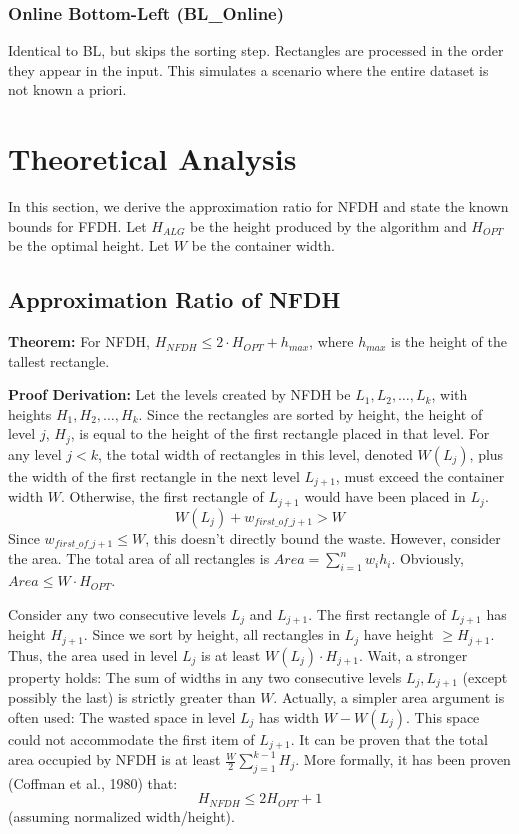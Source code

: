 \documentclass[a4paper,12pt]{article}
\begin{document}
\subsubsection{Online Bottom-Left (BL\_Online)}
Identical to BL, but skips the sorting step. Rectangles are processed in the order they appear in the input. This simulates a scenario where the entire dataset is not known a priori.

\section{Theoretical Analysis}
In this section, we derive the approximation ratio for NFDH and state the known bounds for FFDH. Let $H_{ALG}$ be the height produced by the algorithm and $H_{OPT}$ be the optimal height. Let $W$ be the container width.

\subsection{Approximation Ratio of NFDH}
\textbf{Theorem:} For NFDH, $H_{NFDH} \le 2 \cdot H_{OPT} + h_{max}$, where $h_{max}$ is the height of the tallest rectangle.

\textbf{Proof Derivation:}
Let the levels created by NFDH be $L_1, L_2, \dots, L_k$, with heights $H_1, H_2, \dots, H_k$.
Since the rectangles are sorted by height, the height of level $j$, $H_j$, is equal to the height of the first rectangle placed in that level.
For any level $j < k$, the total width of rectangles in this level, denoted $W(L_j)$, plus the width of the first rectangle in the next level $L_{j+1}$, must exceed the container width $W$. Otherwise, the first rectangle of $L_{j+1}$ would have been placed in $L_j$.
\[ W(L_j) + w_{first\_of\_j+1} > W \]
Since $w_{first\_of\_j+1} \le W$, this doesn't directly bound the waste. However, consider the area.
The total area of all rectangles is $Area = \sum_{i=1}^n w_i h_i$.
Obviously, $Area \le W \cdot H_{OPT}$.

Consider any two consecutive levels $L_j$ and $L_{j+1}$.
The first rectangle of $L_{j+1}$ has height $H_{j+1}$. Since we sort by height, all rectangles in $L_j$ have height $\ge H_{j+1}$.
Thus, the area used in level $L_j$ is at least $W(L_j) \cdot H_{j+1}$.
Wait, a stronger property holds: The sum of widths in any two consecutive levels $L_j, L_{j+1}$ (except possibly the last) is strictly greater than $W$.
Actually, a simpler area argument is often used:
The wasted space in level $L_j$ has width $W - W(L_j)$. This space could not accommodate the first item of $L_{j+1}$.
It can be proven that the total area occupied by NFDH is at least $\frac{W}{2} \sum_{j=1}^{k-1} H_j$.
More formally, it has been proven (Coffman et al., 1980) that:
\[ H_{NFDH} \le 2 H_{OPT} + 1 \]
(assuming normalized width/height).
\end{document}
